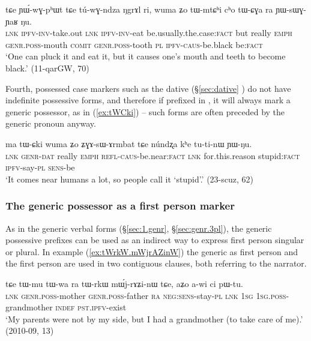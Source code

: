 \begin{exe}
\ex  \label{ex:genr.tWmtChi}
\gll
tɕe ɲɯ́-wɣ-pʰɯt tɕe tú-wɣ-ndza ŋgrɤl ri, wuma ʑo tɯ-mtɕʰi cʰo tɯ-ɕɣa ra ɲɯ-sɯɣ-ɲaʁ ŋu. \\
\textsc{lnk} \textsc{ipfv}-\textsc{inv}-take.out \textsc{lnk} \textsc{ipfv}-\textsc{inv}-eat be.usually.the.case:\textsc{fact} but really \textsc{emph}  \textsc{genr}.\textsc{poss}-mouth \textsc{comit} \textsc{genr}.\textsc{poss}-tooth \textsc{pl}  \textsc{ipfv}-\textsc{caus}-be.black be:\textsc{fact} \\
\glt `One can pluck it and eat it, but it causes one's mouth and teeth to become black.' (11-qarGW, 70) 
\end{exe}

Fourth, possessed case markers such as the dative  (§\ref{sec:dative} ) do not have indefinite possessive forms, and therefore if prefixed in , it will always mark a generic possessor, as in (\ref{ex:tWCki}) -- such forms are often preceded by the generic pronoun  anyway.

\begin{exe}
\ex  \label{ex:tWCki}
\gll ma tɯ-ɕki wuma ʑo ʑɣɤ-sɯ-ɤrmbat tɕe núndʐa kʰe tu-ti-nɯ ɲɯ-ŋu. \\
\textsc{lnk} \textsc{genr}-\textsc{dat} really \textsc{emph} \textsc{refl}-\textsc{caus}-be.near:\textsc{fact} \textsc{lnk} for.this.reason stupid:\textsc{fact} \textsc{ipfv}-say-\textsc{pl} \textsc{sens}-be \\
\glt `It comes near humans a lot, so people call it `stupid'.' (23-scuz, 62) 
\end{exe}

\subsubsection{The generic possessor as a first person marker} \label{sec:generic.tW.1sg}
As in the generic verbal forms (§\ref{sec:1.genr}, §\ref{sec:genr.3pl}), the generic possessive prefixes can be used as an indirect way to express first person singular or plural. In example (\ref{ex:tWrkW.mWjrAZinW}) the generic as first person and the first person are used in two contiguous clauses, both referring to the narrator.

\begin{exe}
\ex  \label{ex:tWrkW.mWjrAZinW}
\gll tɕe tɯ-mu tɯ-wa ra tɯ-rkɯ mɯ́j-rɤʑi-nɯ tɕe, aʑo a-wi ci pɯ-tu. \\
\textsc{lnk} \textsc{genr}.\textsc{poss}-mother  \textsc{genr}.\textsc{poss}-father \textsc{ra}  \textsc{neg}:\textsc{sens}-stay-\textsc{pl} \textsc{lnk} \textsc{1sg} \textsc{1sg}.\textsc{poss}-grandmother \textsc{indef} \textsc{pst}.\textsc{ipfv}-exist \\ 
\glt `My parents were not by my side, but I had a grandmother (to take care of me).' (2010-09, 13)
\end{exe}


